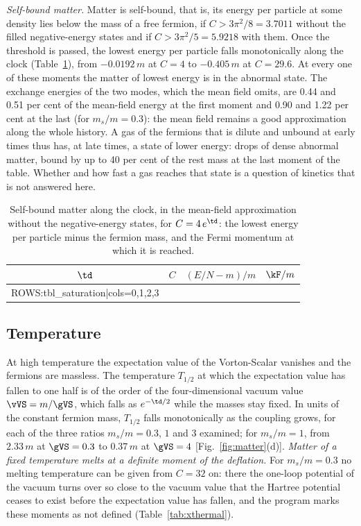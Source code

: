 \emph{Self-bound matter.} Matter is self-bound, that is, its energy per particle at some density
lies below the mass of a free fermion, if $C>3\pi^{2}/8=3.7011$ without the filled negative-energy
states and if $C>3\pi^{2}/5=5.9218$ with them. Once the threshold is passed, the lowest energy per
particle falls monotonically along the clock (Table~\ref{tab:saturation}), from $-0.0192\,m$ at
$C=4$ to $-0.405\,m$ at $C=29.6$. At every one of these moments the matter of lowest energy is in the
abnormal state. The exchange energies of the two modes, which the mean field omits, are 0.44 and
0.51 per cent of the mean-field energy at the first moment and 0.90 and 1.22 per cent at the last
(for $m_s/m=0.3$):
the mean field remains a good approximation along the whole history. A gas of the fermions that is
dilute and unbound at early times thus has, at late times, a state of lower energy: drops of dense
abnormal matter, bound by up to 40 per cent of the rest mass at the last moment of the table.
Whether and how fast a gas reaches that state is a question of kinetics that is not answered here.

\begin{table}
\caption{\label{tab:saturation}Self-bound matter along the clock, in the mean-field approximation
without the negative-energy states, for $C=4\,e^{\td}$: the lowest energy per particle minus the
fermion mass, and the Fermi momentum at which it is reached.}
\begin{ruledtabular}
\begin{tabular}{cccc}
$\td$ & $C$ & $(E/N-m)/m$ & $\kF/m$ \\
\hline
{{ROWS:tbl_saturation|cols=0,1,2,3}}
\end{tabular}
\end{ruledtabular}
\end{table}

\subsection{Temperature}

At high temperature the expectation value of the Vorton-Scalar vanishes and the fermions are
massless. The temperature $T_{1/2}$ at which the expectation value has fallen to one half is of the
order of the four-dimensional vacuum value $\vVS=m/\gVS$, which falls as $e^{-\td/2}$ while the
masses stay fixed. In units of the constant fermion mass, $T_{1/2}$ falls monotonically as the
coupling grows, for each of the three ratios $m_s/m=0.3$, $1$ and $3$ examined; for $m_s/m=1$, from
$2.33\,m$ at $\gVS=0.3$ to $0.37\,m$ at $\gVS=4$ [Fig.~\ref{fig:matter}(d)]. \emph{Matter of a fixed
temperature melts at a definite moment of the deflation.} For $m_s/m=0.3$ no melting temperature
can be given from $C=32$ on: there the one-loop potential of the vacuum turns over so close to the
vacuum value that the Hartree potential ceases to exist before the expectation value has fallen, and
the program marks these moments as not defined (Table~\ref{tab:xthermal}).

